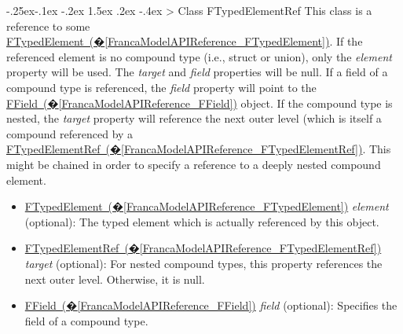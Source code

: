 \documentclass[a4paper,10pt]{scrreprt}
\makeatletter
\renewcommand\subsection{\medskip\@startsection{subsection}{2}{\z@}%
  {-.25ex\@plus -.1ex \@minus -.2ex}%
  {1.5ex \@plus .2ex \@minus -.4ex}%
  {\ifnum \scr@compatibility>\@nameuse{scr@v@2.96}\relax
    \setlength{\parfillskip}{\z@ plus 1fil}\fi
    \raggedsection\normalfont\sectfont\nobreak\size@subsection
  }%
}
\newlength{\XdocItemIndent}
\makeatother
\begin{document}
\subsection{Class FTypedElementRef}
\label{FrancaModelAPIReference_FTypedElementRef}
This class is a reference to some \hyperref[FrancaModelAPIReference_FTypedElement]{FTypedElement~(�\ref*{FrancaModelAPIReference_FTypedElement})}.
If the referenced element is no compound type (i.e., struct or union), only the \textit{element} property
will be used. The \textit{target} and \textit{field} properties will be null. If a field of a compound type is referenced,
the \textit{field} property will point to the \hyperref[FrancaModelAPIReference_FField]{FField~(�\ref*{FrancaModelAPIReference_FField})} object. 
If the compound type is nested, the \textit{target} property will reference the next outer level
(which is itself a compound referenced by a \hyperref[FrancaModelAPIReference_FTypedElementRef]{FTypedElementRef~(�\ref*{FrancaModelAPIReference_FTypedElementRef})}. 
This might be chained in order to specify a reference to a deeply nested compound element.
\setlength{\XdocItemIndent}{\textwidth}
\begin{itemize}
\addtolength{\XdocItemIndent}{-2.5em}
\item \begin{minipage}[t]{\XdocItemIndent}
\hyperref[FrancaModelAPIReference_FTypedElement]{FTypedElement~(�\ref*{FrancaModelAPIReference_FTypedElement})} \textit{element} (optional): The typed element which is actually referenced by this object.

\end{minipage}
\item \begin{minipage}[t]{\XdocItemIndent}
\hyperref[FrancaModelAPIReference_FTypedElementRef]{FTypedElementRef~(�\ref*{FrancaModelAPIReference_FTypedElementRef})} \textit{target} (optional): For nested compound types, this property references the next outer level. Otherwise, it is null.

\end{minipage}
\item \begin{minipage}[t]{\XdocItemIndent}
\hyperref[FrancaModelAPIReference_FField]{FField~(�\ref*{FrancaModelAPIReference_FField})} \textit{field} (optional): Specifies the field of a compound type.

\end{minipage}
\end{itemize}
\addtolength{\XdocItemIndent}{2.5em}
\end{document}
